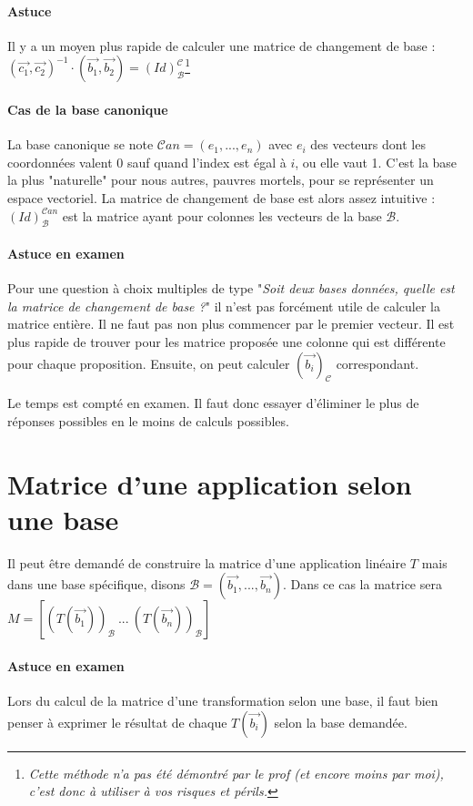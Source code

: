 \documentclass[10pt,a4paper]{book}
\begin{document}
\paragraph{Astuce}
Il y a un moyen plus rapide de calculer une matrice de changement de base : $(\vec{c_1},\vec{c_2})^{-1}\cdot (\vec{b_1},\vec{b_2}) = (Id)^{\mathcal{C}}_{\mathcal{B}}$\footnote{\textit{Cette méthode n'a pas été démontré par le prof (et encore moins par moi), c'est donc à utiliser à vos risques et périls.}}

\paragraph{Cas de la base canonique}
La base canonique se note $\mathcal{C}an = (e_1,...,e_n)$ avec $e_i$ des vecteurs dont les coordonnées valent 0 sauf quand l'index est égal à $i$, ou elle vaut 1. C'est la base la plus "naturelle" pour nous autres, pauvres mortels, pour se représenter un espace vectoriel. La matrice de changement de base est alors assez intuitive : $(Id)^{\mathcal{C}an}_{\mathcal{B}}$ est la matrice ayant pour colonnes les vecteurs de la base $\mathcal{B}$.

\paragraph{Astuce en examen}
Pour une question à choix multiples de type "\textit{Soit deux bases données, quelle est la matrice de changement de base ?}" il n'est pas forcément utile de calculer la matrice entière. Il ne faut pas non plus commencer par le premier vecteur. Il est plus rapide de trouver pour les matrice proposée une colonne qui est différente pour chaque proposition. Ensuite, on peut calculer $(\vec{b_i})_\mathcal{C}$ correspondant.\par 
Le temps est compté en examen. Il faut donc essayer d'éliminer le plus de réponses possibles en le moins de calculs possibles.

\section{Matrice d'une application selon une base}
Il peut être demandé de construire la matrice d'une application linéaire $T$ mais dans une base spécifique, disons $\mathcal{B}=(\vec{b_1},...,\vec{b_n})$. Dans ce cas la matrice sera $M = [(T(\vec{b_1}))_\mathcal{B}\ ...\ (T(\vec{b_n}))_\mathcal{B}]$

\paragraph{Astuce en examen}
Lors du calcul de la matrice d'une transformation selon une base, il faut bien penser à exprimer le résultat de chaque $T(\vec{b_i})$ selon la base demandée.
\end{document}
